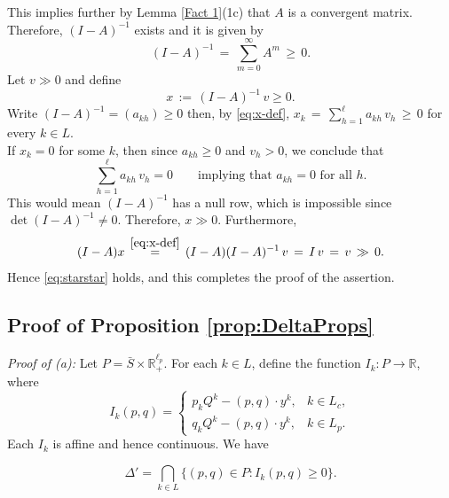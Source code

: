 \documentclass[11pt,fleqn]{article}
\begin{document}
This implies further by Lemma \ref{Fact 1}(1c) that $A$ is a convergent matrix. Therefore, $(I-A)^{-1}$ exists and it is given by
\[
(I-A)^{-1} \, =\,  \sum_{m=0}^{\infty} A^{m} \, \geqslant \,  0.
\]
Let $v\gg 0$ and define
\begin{equation}\label{eq:x-def}
x \, :=\,  (I-A)^{-1}\,v \geqslant 0 .
\end{equation}
Write $(I-A)^{-1} = (a_{kh})\geqslant 0$ then, by \eqref{eq:x-def}, $x_{k} \, =\,  \sum_{h=1}^{\ell} a_{kh}\,v_{h} \, \geqslant \,  0$ for every $k \in L$.  \\
If $x_{k}=0$ for some $k$, then since $a_{kh}\geqslant 0$ and $v_{h}>0$, we conclude that
\[
\sum_{h=1}^{\ell} a_{kh}\,v_{h} = 0 \qquad \mbox{implying that }  a_{kh} = 0 \mbox{ for all } h.
\]
This would mean $(I-A)^{-1}$ has a null row, which is impossible since $\det(I-A)^{-1}\neq 0$.  Therefore, $x \gg 0$. Furthermore,
\[
(I-A)x \, \stackrel{\eqref{eq:x-def}}{=}\,  (I-A)(I-A)^{-1}\,v \, =\,  I\,v \, =\,  v \, \gg\,  0.
\]
Hence \eqref{eq:starstar} holds, and this completes the proof of the assertion.\\

\vskip 0.2cm


\subsection{Proof of Proposition \ref{prop:DeltaProps}}\label{sec: app A2}

		\emph{Proof of (a):} Let $P= \bar S \times \mathbb R^{\ell_p}_+$. For each \(k\in L\), define the function $	I_k:P\to \mathbb{R}$, where
		\[
		I_k(p,q)=
		\begin{cases}
		p_kQ^k-(p,q)\cdot y^k, & k\in L_c,\\[1ex]
		q_kQ^k-(p,q)\cdot y^k, & k\in L_p.
		\end{cases}
		\]
		Each \(I_k\) is affine and hence continuous. We have
	
		\[
		\Delta'=\bigcap_{k\in L}\{(p,q)\in P: I_k(p,q)\geqslant 0\}.
		\]
		
\end{document}
